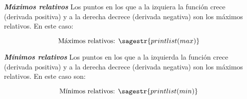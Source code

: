 
\textbf{\textit{Máximos relativos}}
\ifverbose
Los puntos en los que a la izquiera la función crece (derivada positiva) y a la derecha decrece (derivada negativa) son los máximos relativos. En este caso: 
\fi

\[\text{Máximos relativos: } \sagestr{printlist(max)}\]

\textbf{\textit{Mínimos relativos}}
\ifverbose
Los puntos en los que a la izquierda la función crece (derivada positiva) y a la derecha decrece (derivada negativa) son los máximos relativos. En este caso son: 
\fi

\[\text{Mínimos relativos: }\sagestr{printlist(min)}\]


